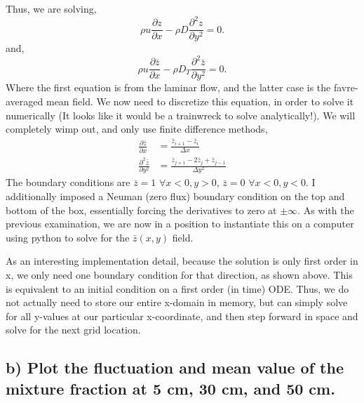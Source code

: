 \documentclass{article}
\begin{document}
Thus, we are solving, 
\begin{equation}
\rho u \frac{\partial z}{\partial x} - \rho D \frac{\partial^2
  z}{\partial y^2} = 0. 
\end{equation}
and, 
\begin{equation}
\rho u \frac{\partial \bar z}{\partial x} - \rho D_T \frac{\partial^2
  \bar z}{\partial y^2} = 0. 
\end{equation}
Where the first equation is from the laminar flow, and the latter case
is the favre-averaged mean field. We now need to discretize this
equation, in order to solve it numerically (It looks like it would be a
trainwreck to solve analytically!). We will completely wimp out, and
only use finite difference methods, 
\begin{align}
  \frac{\partial \bar z}{\partial x} &= \frac{\bar z_{i+1}-\bar z_{i}}{\Delta x} \\
  \label{first}
  \frac{\partial^2 \bar z}{\partial y^2} &= \frac{\bar z_{j+1}-2\bar z_{j}+\bar z_{j-1}}{\Delta y^2} 
\end{align}
The boundary conditions are $\bar z = 1$ $\forall x<0,y>0$, $\bar z = 0$
$\forall x<0,y<0$. I additionally imposed a Neuman (zero flux) boundary
condition on the top and bottom of the box, essentially forcing the
derivatives to zero at $\pm \infty$. As with the previous examination,  
we are now in a position to instantiate this on a computer using python
to solve for the $\bar z(x,y)$ field.  

As an interesting implementation detail, because the solution is only
first order in x, we only need one boundary condition for that
direction, as shown above. This is equivalent to an initial condition on
a first order (in time) ODE. Thus, we do not actually need to store our
entire x-domain in memory, but can simply solve for all y-values at our
particular x-coordinate, and then step forward in space and solve for
the next grid location. 

%
%
%
%
\subsection*{b) Plot the fluctuation and mean value of the mixture
fraction at 5 cm, 30 cm, and 50 cm.}
\end{document}
